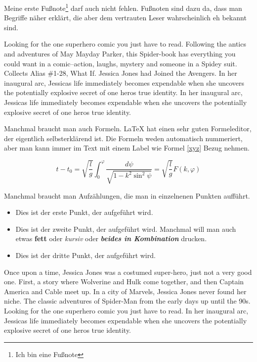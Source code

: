 Meine erste Fußnote\footnote{Ich bin eine Fußnote} darf auch nicht fehlen. Fußnoten sind dazu da, dass man Begriffe näher erklärt, die aber dem vertrauten Leser wahrscheinlich eh bekannt sind. 





Looking for the one superhero comic you just have to read. Following the antics and adventures of May Mayday Parker, this Spider-book has everything you could want in a comic--action, laughs, mystery and someone in a Spidey suit. Collects Alias \#1-28, What If. Jessica Jones had Joined the Avengers. In her inaugural arc, Jessicas life immediately becomes expendable when she uncovers the potentially explosive secret of one heros true identity. In her inaugural arc, Jessicas life immediately becomes expendable when she uncovers the potentially explosive secret of one heros true identity.

Manchmal braucht man auch Formeln. LaTeX hat einen sehr guten Formeleditor, der eigentlich selbsterklärend ist. Die Formeln weden automatisch nummeriert, aber man kann immer im Text mit einem Label wie Formel \ref{xyz} Bezug nehmen.

\begin{equation}
	t-t_{0}=\sqrt{\frac{l}{g}}\int_{0}^{\varphi}{\frac{d\psi}{\sqrt{1-k^{2}\sin^{2} {\psi}}}} = \sqrt{\frac{l}{g}} F(k,\varphi)
	\label{xyz}
\end{equation}

Manchmal braucht man Aufzählungen, die man in einzelnenen Punkten aufführt.
\begin{itemize}
	\item Dies ist der erste Punkt, der aufgeführt wird.
	\item Dies ist der zweite Punkt, der aufgeführt wird. Manchmal will man auch etwas \textbf{fett} oder \textit{kursiv} oder \textbf{\textit{beides in Kombination}}  drucken.
	\item Dies ist der dritte Punkt, der aufgeführt wird.
\end{itemize}

Once upon a time, Jessica Jones was a costumed super-hero, just not a very good one. First, a story where Wolverine and Hulk come together, and then Captain America and Cable meet up. In a city of Marvels, Jessica Jones never found her niche. The classic adventures of Spider-Man from the early days up until the 90s. Looking for the one superhero comic you just have to read. In her inaugural arc, Jessicas life immediately becomes expendable when she uncovers the potentially explosive secret of one heros true identity.

